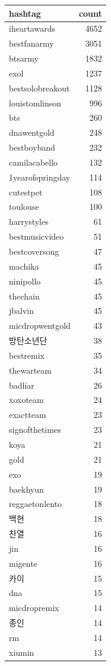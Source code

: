 \begin{tabular}{lr}
\toprule
hashtag & count \\
\midrule
iheartawards & 4652 \\
bestfanarmy & 3051 \\
btsarmy & 1832 \\
exol & 1237 \\
bestsolobreakout & 1128 \\
louistomlinson & 996 \\
bts & 260 \\
dnawentgold & 248 \\
bestboyband & 232 \\
camilacabello & 132 \\
1yearofspringday & 114 \\
cutestpet & 108 \\
toulouse & 100 \\
harrystyles & 61 \\
bestmusicvideo & 51 \\
bestcoversong & 47 \\
machika & 45 \\
ninipollo & 45 \\
thechain & 45 \\
jbalvin & 45 \\
micdropwentgold & 43 \\
방탄소년단 & 38 \\
bestremix & 35 \\
thewarteam & 34 \\
badliar & 26 \\
xoxoteam & 24 \\
exactteam & 23 \\
signofthetimes & 23 \\
koya & 21 \\
gold & 21 \\
exo & 19 \\
baekhyun & 19 \\
reggaetonlento & 18 \\
백현 & 18 \\
찬열 & 16 \\
jin & 16 \\
migente & 16 \\
카이 & 15 \\
dna & 15 \\
micdropremix & 14 \\
종인 & 14 \\
rm & 14 \\
xiumin & 13 \\

\end{tabular}
